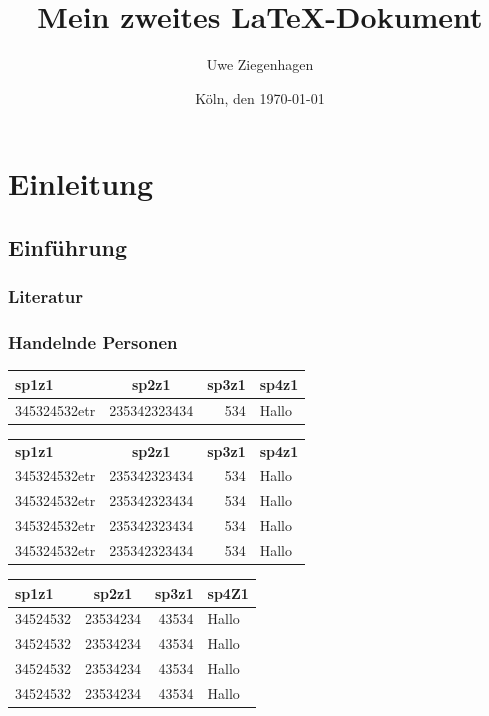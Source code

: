 \documentclass[12pt,ngerman,parskip=half]{scrreprt}
\author{Uwe Ziegenhagen}
\title{Mein zweites \LaTeX-Dokument}
\date{Köln, den \today}
\begin{document}
\maketitle

\tableofcontents

\listoftables

\listoffigures

\chapter{Einleitung}
\section{Einführung}
\subsection{Literatur}
\subsection{Handelnde Personen}

\blindtext

\label{tab:erstetab}
\begin{tabular}{|l|c|r|p{8cm}|} \hline
sp1z1 & sp2z1 & sp3z1 & sp4z1 \\ \hline
345324532etr  & 235342323434 & 534 & Hallo  \\ \hline
\end{tabular}


\begin{center}
\label{tab:erstebooktab}
\begin{tabular}{lcrp{4cm}} \toprule[2.5pt]
\textbf{sp1z1} & \textbf{sp2z1} & \textbf{sp3z1} & \textbf{sp4z1} \\ \addlinespace \cmidrule(rl){1-3}
345324532etr  & 235342323434 & 534 & Hallo  \\ 
345324532etr  & 235342323434 & 534 & Hallo  \\ 
345324532etr  & 235342323434 & 534 & Hallo  \\ 
345324532etr  & 235342323434 & 534 & Hallo  \\ \bottomrule[5pt]
\end{tabular}
\end{center}


\clearpage

\begin{center}
\label{tab:ertsebooktab}
\begin{tabular}{lcrp{2cm}}\toprule
\textbf{sp1z1} & \textbf{sp2z1} & \textbf{sp3z1} & \textbf{sp4Z1} \\ \midrule
34524532 & 23534234 & 43534 & Hallo\\
34524532 & 23534234 & 43534 & Hallo\\
34524532 & 23534234 & 43534 & Hallo\\
34524532 & 23534234 & 43534 & Hallo\\
\bottomrule
\end{tabular}
\end{center}
\end{document}
